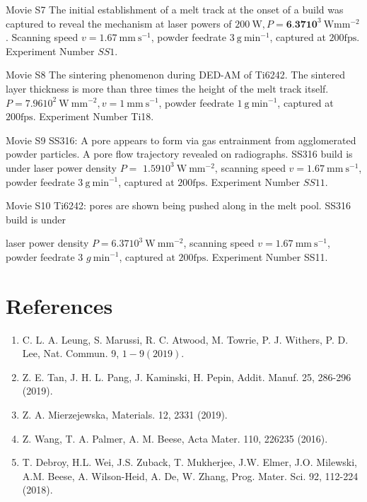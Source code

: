 \documentclass[10pt]{article}
\begin{document}
Movie S7 The initial establishment of a melt track at the onset of a build was captured to reveal the mechanism at laser powers of $200 \mathrm{~W}, P=\mathbf{6 . 3 7} \mathbf{1 0}^{3} \mathrm{~W} \mathrm{mm^{-2 }}$. Scanning speed $v=1.67 \mathrm{~mm} \mathrm{~s}^{-1}$, powder feedrate $3 \mathrm{~g} \mathrm{~min}^{-1}$, captured at $200 \mathrm{fps}$. Experiment Number $S S 1$.

Movie S8 The sintering phenomenon during DED-AM of Ti6242. The sintered layer thickness is more than three times the height of the melt track itself. $P=7.9610^{2} \mathrm{~W} \mathrm{~mm}^{-2}, v=1 \mathrm{~mm} \mathrm{~s}^{-1}$, powder feedrate $1 \mathrm{~g} \mathrm{~min}^{-1}$, captured at $200 \mathrm{fps}$. Experiment Number Ti18.

Movie S9 SS316: A pore appears to form via gas entrainment from agglomerated powder particles. A pore flow trajectory revealed on radiographs. SS316 build is under laser power density $P=$ $1.5910^{3} \mathrm{~W} \mathrm{~mm}^{-2}$, scanning speed $v=1.67 \mathrm{~mm} \mathrm{~s}^{-1}$, powder feedrate $3 \mathrm{~g} \mathrm{~min}^{-1}$, captured at $200 \mathrm{fps}$. Experiment Number $S S 11$.

Movie S10 Ti6242: pores are shown being pushed along in the melt pool. SS316 build is under

laser power density $P=6.3710^{3} \mathrm{~W} \mathrm{~mm}^{-2}$, scanning speed $v=1.67 \mathrm{~mm} \mathrm{~s}^{-1}$, powder feedrate 3 $g \mathrm{~min}^{-1}$, captured at $200 \mathrm{fps}$. Experiment Number SS11.

\section*{References}
\begin{enumerate}
  \item C. L. A. Leung, S. Marussi, R. C. Atwood, M. Towrie, P. J. Withers, P. D. Lee, Nat. Commun. 9, $1-9(2019)$.

  \item Z. E. Tan, J. H. L. Pang, J. Kaminski, H. Pepin, Addit. Manuf. 25, 286-296 (2019).

  \item Z. A. Mierzejewska, Materials. 12, 2331 (2019).

  \item Z. Wang, T. A. Palmer, A. M. Beese, Acta Mater. 110, 226235 (2016).

  \item T. Debroy, H.L. Wei, J.S. Zuback, T. Mukherjee, J.W. Elmer, J.O. Milewski, A.M. Beese, A. Wilson-Heid, A. De, W. Zhang, Prog. Mater. Sci. 92, 112-224 (2018).

\end{enumerate}
\end{document}
